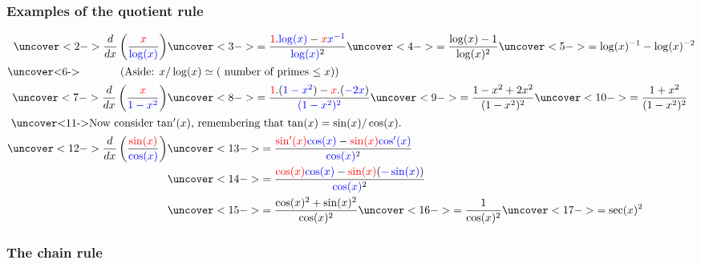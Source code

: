 \documentclass[9pt]{beamer}
\begin{document}
\begin{frame}[t]
 \frametitle{Examples of the quotient rule}
 \vspace{-2ex}
 \begin{align*}
  \uncover<2->{\frac{d}{dx}\left(\frac{\RED{x}}{\BLUE{\log(x)}}\right)} &
  \uncover<3->{=\frac{\RED{1}.\BLUE{\log(x)} - 
    \RED{x}\BLUE{x^{-1}}}{\BLUE{\log(x)}^2}} 
  \uncover<4->{=\frac{\log(x)-1}{\log(x)^2}}
  \uncover<5->{=\log(x)^{-1}-\log(x)^{-2}} \\
  \intertext{\uncover<6->{
    \hspace{3em} (Aside: $x/\log(x) \simeq ($ number of primes $\leq x)$)
   }}
  \uncover<7->{\frac{d}{dx}\left(\frac{\RED{x}}{\BLUE{1-x^2}}\right)} &
  \uncover<8->{= \frac{\RED{1}.(\BLUE{1-x^2}) - \RED{x}.(\BLUE{-2x})}
   {\BLUE{(1-x^2)^2}} } 
  \uncover<9->{= \frac{1-x^2+2x^2}{(1-x^2)^2}}
  \uncover<10->{= \frac{1+x^2}{(1-x^2)^2}} \\
  \intertext{
   \uncover<11->{Now consider $\tan'(x)$, remembering that $\tan(x)=\sin(x)/\cos(x)$.}}
  \uncover<12->{\frac{d}{dx}\left(\frac{\RED{\sin(x)}}{\BLUE{\cos(x)}}\right)} & 
  \uncover<13->{=\frac{\RED{\sin'(x)}\BLUE{\cos(x)}-\RED{\sin(x)}\BLUE{\cos'(x)}}
   {\BLUE{\cos(x)}^2}} \\ &
  \uncover<14->{=\frac{\RED{\cos(x)}\BLUE{\cos(x)}-\RED{\sin(x)}(\BLUE{-\sin(x)})}
   {\BLUE{\cos(x)}^2} } \\ &
  \uncover<15->{=\frac{\cos(x)^2+\sin(x)^2}{\cos(x)^2}}
  \uncover<16->{=\frac{1}{\cos(x)^2}}
  \uncover<17->{=\sec(x)^2}
 \end{align*}
\end{frame}

\begin{frame}[t]
 \frametitle{The chain rule}
 \begin{itemize}
 \end{itemize}
\end{frame}
\end{document}
